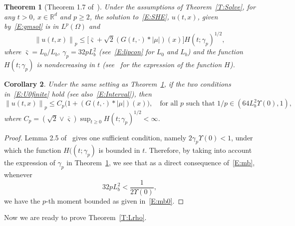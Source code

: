 \documentclass[sn-mathphys]{sn-jnl}%
\newcommand{\BR}{\mathbb{R}}
\newcommand{\Norm}[1]{\left\| #1 \right\|}
\numberwithin{equation}{section}
\theoremstyle{thmstyleone}%
\newtheorem{theorem}{Theorem}[section]%
\newtheorem{corollary}[theorem]{Corollary}
\theoremstyle{thmstyletwo}%
\theoremstyle{thmstylethree}%
\begin{document}
\begin{theorem}[Theorem 1.7 of~\cite{chen.huang:19:comparison}]\label{T:ExUn}
  Under the assumptions of Theorem~\ref{T:Solve}, for any $t>0$, $x \in \BR^d$ and $p \ge 2$, the
  solution to~\eqref{E:SHE}, $u(t,x)$, given by~\eqref{E:gmsol} is in $L^p (\Omega)$ and
  \begin{equation}\label{E:mb}
    \Norm{u(t,x)}_p \le \big[\bar{\varsigma}+\sqrt{2}(G(t,\cdot) * \lvert\mu\rvert)(x)\big]H(t;\gamma_p)^{1/2},
  \end{equation}
  where $\bar{\varsigma} = L_0/L_b$, $\gamma_p = 32pL_b^2$ (see~\eqref{E:lipcon} for $L_0$ and $L_b$)
  and the function $H(t;\gamma_p)$ is nondecreasing in $t$ (see~\cite{chen.huang:19:comparison} for
  the expression of the function $H$).
\end{theorem}

\begin{corollary}\label{C:Mom}
  Under the same setting as Theorem~\ref{T:ExUn}, if the two conditions in~\eqref{E:U0finite} hold
  (see also~\eqref{E:Interval}), then
  \begin{equation}\label{E:mb0}
    \Norm{u(t,x)}_p \le C_p\bigg(1+ (G(t, \cdot)*\lvert\mu\rvert)(x) \bigg),
    \quad \text{for all $p$ such that $1/p \in \left(64 L_b^2\Upsilon(0),1\right)$},
  \end{equation}
  where $C_p = \left(\sqrt{2}\vee \overline{\varsigma}\right)\sup_{t\ge 0}
  H(t;\gamma_p)^{1/2}<\infty$.
\end{corollary}
\begin{proof}
  Lemma 2.5 of~\cite{chen.kim:19:nonlinear} gives one sufficient condition, namely
  $2\gamma_p\Upsilon(0)<1$, under which the function $H((t;\gamma_p)$ is bounded in $t$. Therefore,
  by taking into account the expression of $\gamma_p$ in Theorem~\ref{T:ExUn}, we see that as a
  direct consequence of~\eqref{E:mb}, whenever
  \begin{equation}\label{E:pLip}
     32 p L_b^2 < \frac{1}{2\Upsilon(0)},
  \end{equation}
  we have the $p$-th moment bounded as given in~\eqref{E:mb0}.
\end{proof}


Now we are ready to prove Theorem~\ref{T:Lrho}.
\end{document}
